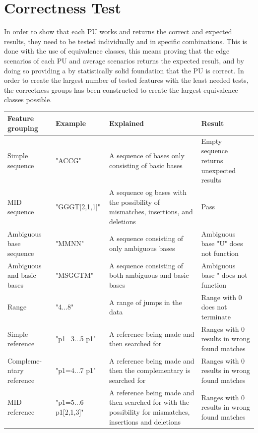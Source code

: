 \documentclass[12pt]{article}
\newcommand{\textapprox}{\raisebox{0.5ex}{\texttildelow}}
\newcommand{\pu}{PU }
\begin{document}
\section{Correctness Test}
In order to show that each \pu works and returns the correct and expected results, they need to be tested individually and in specific combinations. This is done with the use of equivalence classes, this means proving that the edge scenarios of each 
\pu and average scenarios returns the expected result, and by doing so providing a by statistically solid foundation that 
the \pu is correct.
In order to create the largest number of tested features with the least needed tests, the correctness groups has been constructed to create the largest equivalence classes possible. 

\begin{table}[H]
\begin{tabular}{p{2cm}|p{3cm}|p{5cm}|p{4.5cm}}
Feature grouping & Example & Explained & Result  \\ \hline

Simple sequence		& "ACCG"  & A sequence of bases only consisting of basic bases & Empty sequence returns unexpected results\\ \hline

MID sequence 		& "GGGT[2,1,1]" & A sequence og bases with the possibility of mismatches, insertions, and deletions & Pass \\ \hline

Ambiguous base sequence	& "MMNN" & A sequence consisting of only ambiguous bases & Ambiguous base "U" does not function\\ \hline

Ambiguous and basic bases & "MSGGTM" & A sequence consisting of both ambiguous and basic bases & Ambiguous base " does not function\\ \hline

Range & "4...8" & A range of jumps in the data & Range with 0 does not terminate\\ \hline

Simple reference & "p1=3...5 p1" & A reference being made and then searched for  & Ranges with 0 results in wrong found matches\\ \hline

Compleme- ntary reference & "p1=4...7 \textapprox p1" & A reference being made and then the complementary is searched for & Ranges with 0 results in wrong found matches \\ \hline

MID reference & "p1=5...6 p1[2,1,3]" & A reference being made and then searched for with the possibility for mismatches, insertions and deletions & Ranges with 0 results in wrong found matches\\ \hline


\end{tabular}
\end{table}
\end{document}
